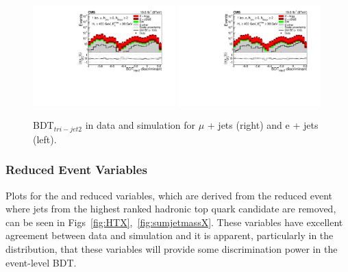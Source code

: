 \begin{figure}[!ht]
    \includegraphics[width=0.49\textwidth]{images/Run1/figures/MultiTopness_Mu.pdf}
    \includegraphics[width=0.49\textwidth]{images/Run1/figures/MultiTopness_e.pdf}
    \caption{BDT$_{tri-jet2}$ in data and simulation for $\mu$ + jets (right) and e + jets (left).}
    \label{fig:Multitopness}
\end{figure}

\subsubsection*{Reduced Event Variables}


Plots for the \HTX and \sumjetmassX reduced variables, which are derived from the reduced event where jets from the highest ranked hadronic top quark candidate are removed, can be seen in Figs~\ref{fig:HTX},~\ref{fig:sumjetmassX}. These variables have excellent agreement between data and simulation and it is apparent, particularly in the \HTX distribution, that these variables will provide some discrimination power in the event-level BDT.

